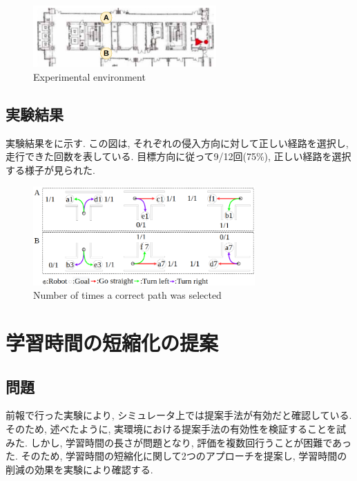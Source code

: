 \documentclass{jarticle}
\begin{document}
 \begin{figure}[h]
  \centering
   \includegraphics[width=70mm]{tsudanuma2.png}
   \vspace*{-4mm}
   \caption{Experimental environment}
   \label{fig: fig7}
 \end{figure}

\subsection{実験結果}
実験結果をに示す. この図は, それぞれの侵入方向に対して正しい経路を選択し, 走行できた回数を表している. 目標方向に従って9/12回(75\%), 正しい経路を選択する様子が見られた.

\begin{figure}[h]
  \centering
   \includegraphics[width=85mm]{60000step_real2.png}
   \vspace*{-4mm}
   \caption{Number of times a correct path was selected}
   \label{fig: fig8}
 \end{figure}

\section{学習時間の短縮化の提案}
\subsection{問題}
前報\cite{mech}で行った実験により, シミュレータ上では提案手法が有効だと確認している. そのため, 述べたように, 実環境における提案手法の有効性を検証することを試みた. しかし, 学習時間の長さが問題となり, 評価を複数回行うことが困難であった. そのため, 学習時間の短縮化に関して2つのアプローチを提案し, 学習時間の削減の効果を実験により確認する.
\end{document}
